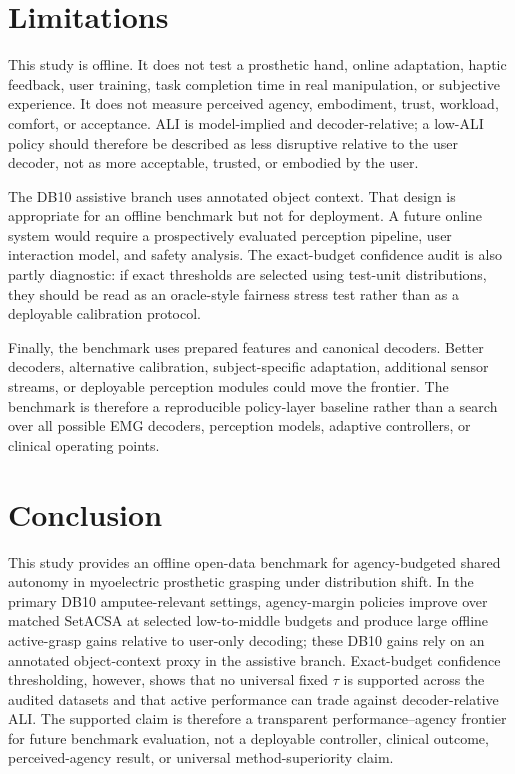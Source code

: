\documentclass[journal]{IEEEtran}
\begin{document}
\section{Limitations}
This study is offline. It does not test a prosthetic hand, online adaptation, haptic feedback, user training, task completion time in real manipulation, or subjective experience. It does not measure perceived agency, embodiment, trust, workload, comfort, or acceptance. ALI is model-implied and decoder-relative; a low-ALI policy should therefore be described as less disruptive relative to the user decoder, not as more acceptable, trusted, or embodied by the user.

The DB10 assistive branch uses annotated object context. That design is appropriate for an offline benchmark but not for deployment. A future online system would require a prospectively evaluated perception pipeline, user interaction model, and safety analysis. The exact-budget confidence audit is also partly diagnostic: if exact thresholds are selected using test-unit distributions, they should be read as an oracle-style fairness stress test rather than as a deployable calibration protocol.

Finally, the benchmark uses prepared features and canonical decoders. Better decoders, alternative calibration, subject-specific adaptation, additional sensor streams, or deployable perception modules could move the frontier. The benchmark is therefore a reproducible policy-layer baseline rather than a search over all possible EMG decoders, perception models, adaptive controllers, or clinical operating points.

\section{Conclusion}
This study provides an offline open-data benchmark for agency-budgeted shared autonomy in myoelectric prosthetic grasping under distribution shift. In the primary DB10 amputee-relevant settings, agency-margin policies improve over matched SetACSA at selected low-to-middle budgets and produce large offline active-grasp gains relative to user-only decoding; these DB10 gains rely on an annotated object-context proxy in the assistive branch. Exact-budget confidence thresholding, however, shows that no universal fixed $\tau$ is supported across the audited datasets and that active performance can trade against decoder-relative ALI. The supported claim is therefore a transparent performance--agency frontier for future benchmark evaluation, not a deployable controller, clinical outcome, perceived-agency result, or universal method-superiority claim.
\end{document}
